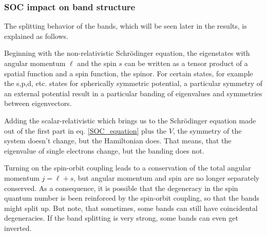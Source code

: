 \subsubsection{SOC impact on band structure}
	The splitting behavior of the bands, which will be seen later in the results, is explained as follows.
	
	Beginning with the non-relativistic Schrödinger equation, the eigenstates with angular momentum $\ell$ and the spin $s$ can be written as a tensor product of a spatial function and a spin function, the spinor. For certain states, for example the s,p,d, etc. states for spherically symmetric potential, a particular symmetry of an external potential result in a particular banding of eigenvalues and symmetries between eigenvectors. 
	
	Adding the scalar-relativistic which brings us to the Schrödinger equation made out of the first part in eq. \eqref{SOC_equation} plus the $V$, the symmetry of the system doesn't change, but the Hamiltonian does. That means, that the eigenvalue of single electrons change, but the banding does not. 
	
	Turning on the spin-orbit coupling leads to a conservation of the total angular momentum $j=\ell + s$, but angular momentum and spin are no longer separately conserved. 
	As a consequence, it is possible that the degeneracy in the spin quantum number is been reinforced by the spin-orbit coupling, so that the bands might split up. But note, that sometimes, some bands can still have coincidental degeneracies. 
	If the band splitting is very strong, some bands can even get inverted.
	
	

